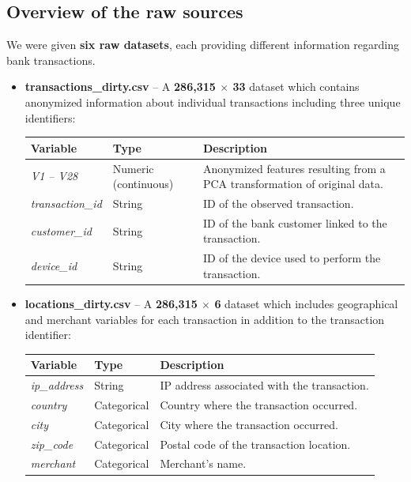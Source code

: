 \documentclass[12pt,a4paper]{report}
\begin{document}
\subsection{Overview of the raw sources}
We were given \textbf{six raw datasets}, each providing different information regarding bank transactions. 
\begin{itemize}

    \item \textbf{transactions\_dirty.csv} – A \textbf{286,315 $\times$ 33} dataset which contains anonymized information 
    about individual transactions including three unique identifiers:

    \begin{center}
    \begin{tabular}{|l|l|p{8cm}|}
        \hline
        \textbf{Variable} & \textbf{Type} & \textbf{Description} \\
        \hline
        \textit{V1 -- V28} & Numeric (continuous) & Anonymized features resulting from a PCA transformation of original data. \\
        \hline
        \textit{transaction\_id} & String & ID of the observed transaction. \\
        \hline
        \textit{customer\_id} & String & ID of the bank customer linked to the transaction. \\
        \hline
        \textit{device\_id} & String & ID of the device used to perform the transaction. \\
        \hline
    \end{tabular}
    \end{center}

    \item \textbf{locations\_dirty.csv} – A \textbf{286,315 $\times$ 6} dataset which includes geographical and merchant variables 
    for each transaction in addition to the transaction identifier:

    \begin{center}
    \begin{tabular}{|l|l|p{8cm}|}
        \hline
        \textbf{Variable} & \textbf{Type} & \textbf{Description} \\
        \hline
        \textit{ip\_address} & String & IP address associated with the transaction. \\
        \hline
        \textit{country} & Categorical & Country where the transaction occurred. \\
        \hline
        \textit{city} & Categorical & City where the transaction occurred. \\
        \hline
        \textit{zip\_code} & Categorical & Postal code of the transaction location. \\
        \hline
        \textit{merchant} & Categorical & Merchant's name. \\
        \hline
    \end{tabular}
    \end{center}


\end{itemize}
\end{document}
